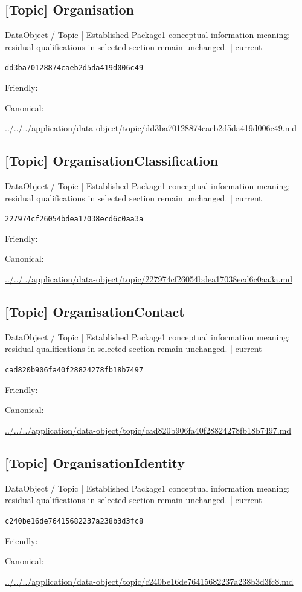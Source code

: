 \documentclass[10pt,a4paper]{article}
\begin{document}
\subsection*{[Topic] Organisation}
{\small DataObject / Topic | Established Package1 conceptual information meaning; residual qualifications in selected section remain unchanged. | current}\par
\texttt{dd3ba70128874caeb2d5da419d006c49}\par
Friendly: \par
Canonical: \par
{\footnotesize\url{../../../application/data-object/topic/dd3ba70128874caeb2d5da419d006c49.md}}\par
\subsection*{[Topic] OrganisationClassification}
{\small DataObject / Topic | Established Package1 conceptual information meaning; residual qualifications in selected section remain unchanged. | current}\par
\texttt{227974cf26054bdea17038ecd6c0aa3a}\par
Friendly: \par
Canonical: \par
{\footnotesize\url{../../../application/data-object/topic/227974cf26054bdea17038ecd6c0aa3a.md}}\par
\subsection*{[Topic] OrganisationContact}
{\small DataObject / Topic | Established Package1 conceptual information meaning; residual qualifications in selected section remain unchanged. | current}\par
\texttt{cad820b906fa40f28824278fb18b7497}\par
Friendly: \par
Canonical: \par
{\footnotesize\url{../../../application/data-object/topic/cad820b906fa40f28824278fb18b7497.md}}\par
\subsection*{[Topic] OrganisationIdentity}
{\small DataObject / Topic | Established Package1 conceptual information meaning; residual qualifications in selected section remain unchanged. | current}\par
\texttt{c240be16de76415682237a238b3d3fc8}\par
Friendly: \par
Canonical: \par
{\footnotesize\url{../../../application/data-object/topic/c240be16de76415682237a238b3d3fc8.md}}\par
\end{document}
